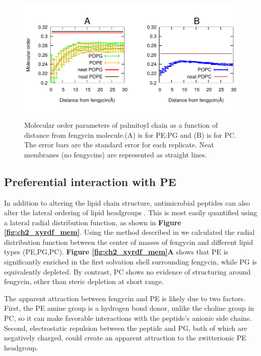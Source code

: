 \begin{figure}
\centering
\includegraphics[width=1.0\textwidth]{chapter2_figs/dibmop_corr.pdf}
\caption{\label{fig:ch2_dibmop}Molecular order parameters of palmitoyl chain as a
function of distance from fengycin molecule.(A) is for PE:PG and (B) is for PC.
The error bars are the standard error for each replicate. Neat membranes (no
fengycins) are represented as straight lines.}
\end{figure}


\subsection{Preferential interaction with PE}
\label{subsec:xyrdf_feng_lipid}

In addition to altering the lipid chain structure, antimicrobial peptides can
also alter the lateral ordering of lipid headgroups .\cite{Epand2012,Epand2009}
 This is most easily quantified using a lateral
radial distribution function, as shown in \textbf{Figure \ref{fig:ch2_xyrdf_mem}}. Using the method described in \textbf{}
we calculated the radial distribution function between the center of masses of fengycin and different lipid types (PE,PG,PC).
\textbf{Figure \ref{fig:ch2_xyrdf_mem}A} shows that PE is significantly enriched in the first solvation shell surrounding fengycin,
while PG is equivalently depleted. By contrast, PC shows no evidence of structuring
around fengycin, other than steric depletion at short range.

The apparent attraction between fengycin and PE is likely due to two factors.
First, the PE amine group is a hydrogen bond donor, unlike the choline group in
PC, so it can make favorable interactions with the peptide's anionic side
chains.
Second, electrostatic repulsion between the peptide and PG, both of
which are negatively charged, could create an apparent attraction to the zwitterionic PE headgroup.


